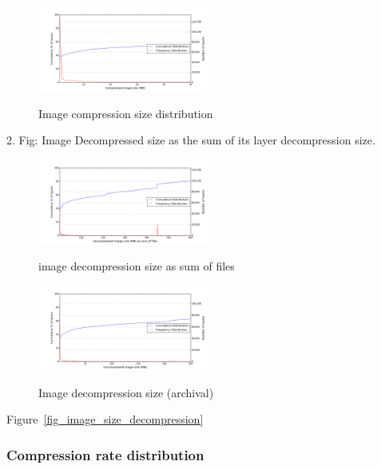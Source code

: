 \begin{figure}
	\centering
	\includegraphics[width=0.5\textwidth]{graphs/distributionCompressed_image_size_(MB)}\\
	\caption{Image compression size distribution}\label{fig_image_size_compression}
\end{figure}

2. Fig: Image Decompressed size as the sum of its layer decompression size.

\begin{figure}
	\centering
	\includegraphics[width=0.5\textwidth]{graphs/distributionUncompressed_image_size_(MB)_as_sum_of_files}\\
	\caption{image decompression size as sum of files}\label{fig_image_size_compression}
\end{figure}

\begin{figure}
	\centering
	\includegraphics[width=0.5\textwidth]{graphs/distributionUncompressed_image_size_(MB)}\\
	\caption{Image decompression size (archival)}\label{fig_image_size_compression}
\end{figure}

Figure~\ref{fig_image_size_decompression}

\subsubsection{Compression rate distribution}

